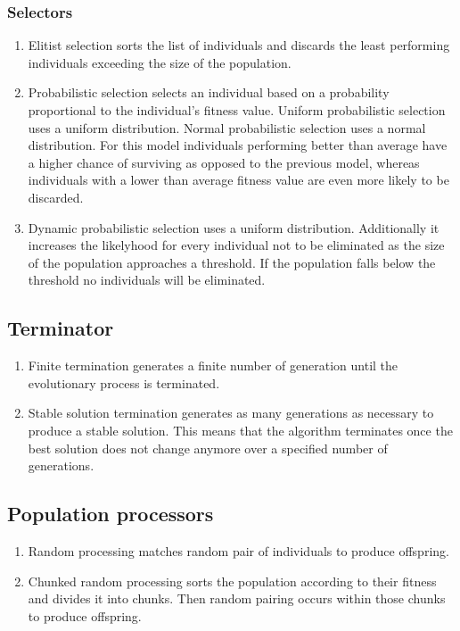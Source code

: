 \documentclass[a4paper,10pt]{article}
\begin{document}
\subsubsection{Selectors}
\begin{enumerate}
 \item Elitist selection sorts the list of individuals and discards the least performing individuals exceeding the size of the population.
 \item Probabilistic selection selects an individual based on a probability proportional to the individual's fitness value.
    \subitem Uniform probabilistic selection uses a uniform distribution.
    \subitem Normal probabilistic selection uses a normal distribution. For this model individuals performing better than average have a higher chance of surviving as opposed to the previous model, whereas individuals with a lower than average fitness value are even more likely to be discarded.
  \item Dynamic probabilistic selection uses a uniform distribution. Additionally it increases the likelyhood for every individual not to be eliminated as the size of the population approaches a threshold. If the population falls below the threshold no individuals will be eliminated.
\end{enumerate}

\subsection{Terminator}
\begin{enumerate}
 \item Finite termination generates a finite number of generation until the evolutionary process is terminated.
 \item Stable solution termination generates as many generations as necessary to produce a stable solution. This means that the algorithm terminates once the best solution does not change anymore over a specified number of generations.
\end{enumerate}

\subsection{Population processors}
\begin{enumerate}
 \item Random processing matches random pair of individuals to produce offspring.
 \item Chunked random processing sorts the population according to their fitness and divides it into chunks. Then random pairing occurs within those chunks to produce offspring.
\end{enumerate}
\end{document}
